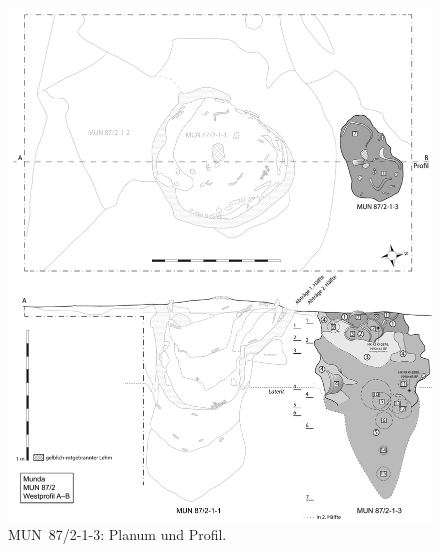 \begin{figure}[p]
	\centering
	\includegraphics[width=\textwidth]{fig/MUN87-213.pdf}
	\caption{MUN~87/2-1-3: Planum und Profil.}
	\label{fig:MUN87.2-1-3_Planum+Profil_Zeichnung}
\end{figure}

